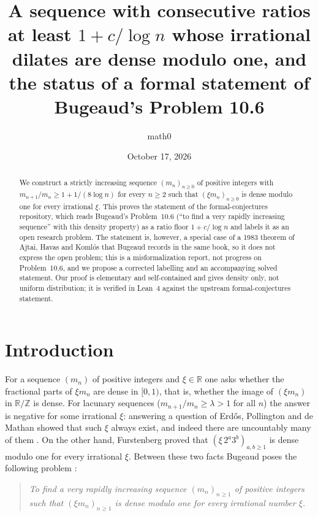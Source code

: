 \documentclass[11pt]{amsart}
\title[Ratio floor $1+c/\log n$ and density modulo one]{A sequence with consecutive ratios at least $1+c/\log n$ whose irrational dilates are dense modulo one, and the status of a formal statement of Bugeaud's Problem 10.6}
\author{math0}
\date{October 17, 2026}
\theoremstyle{plain}
\theoremstyle{definition}
\newcommand{\R}{\mathbb{R}}
\newcommand{\Z}{\mathbb{Z}}
\begin{document}
\begin{abstract}
We construct a strictly increasing sequence $(m_n)_{n\ge0}$ of positive integers with $m_{n+1}/m_n\ge 1+1/(8\log n)$ for every $n\ge2$ such that $(\xi m_n)_{n\ge0}$ is dense modulo one for every irrational $\xi$.
This proves the statement  of the formal-conjectures repository, which reads Bugeaud's Problem~10.6 (``to find a very rapidly increasing sequence'' with this density property) as a ratio floor $1+c/\log n$ and labels it as an open research problem.
The statement is, however, a special case of a 1983 theorem of Ajtai, Havas and Koml\'os that Bugeaud records in the same book, so it does not express the open problem; this is a misformalization report, not progress on Problem~10.6, and we propose a corrected labelling and an accompanying solved statement.
Our proof is elementary and self-contained and gives density only, not uniform distribution; it is verified in Lean~4 against the upstream formal-conjectures statement.
\end{abstract}
\maketitle

\section{Introduction}\label{sec:intro}

For a sequence $(m_n)$ of positive integers and $\xi\in\R$ one asks whether the fractional parts of $\xi m_n$ are dense in $[0,1)$, that is, whether the image of $(\xi m_n)$ in $\R/\Z$ is dense.
For lacunary sequences ($m_{n+1}/m_n\ge\lambda>1$ for all $n$) the answer is negative for some irrational $\xi$: answering a question of Erd\H{o}s, Pollington \cite{Pol79} and de Mathan \cite{Mat80} showed that such $\xi$ always exist, and indeed there are uncountably many of them \cite[pp.~29 and~215]{Bug12}.
On the other hand, Furstenberg \cite{Fur67} proved that $(\xi\,2^a3^b)_{a,b\ge1}$ is dense modulo one for every irrational $\xi$.
Between these two facts Bugeaud poses the following problem \cite[Problem~10.6, p.~215]{Bug12}:
\begin{quote}
\emph{To find a very rapidly increasing sequence $(m_n)_{n\ge1}$ of positive integers such that $(\xi m_n)_{n\ge1}$ is dense modulo one for every irrational number $\xi$.}
\end{quote}
\end{document}
